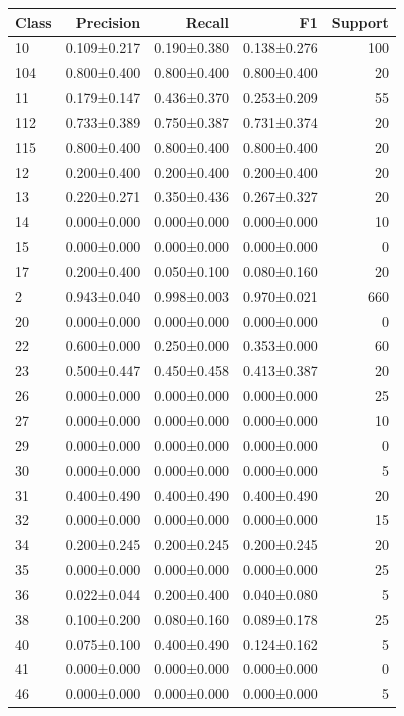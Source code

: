 \begin{tabular}{lrrrr}
\toprule
Class & Precision & Recall & F1 & Support \\
\midrule
10 & 0.109±0.217 & 0.190±0.380 & 0.138±0.276 & 100 \\
104 & 0.800±0.400 & 0.800±0.400 & 0.800±0.400 & 20 \\
11 & 0.179±0.147 & 0.436±0.370 & 0.253±0.209 & 55 \\
112 & 0.733±0.389 & 0.750±0.387 & 0.731±0.374 & 20 \\
115 & 0.800±0.400 & 0.800±0.400 & 0.800±0.400 & 20 \\
12 & 0.200±0.400 & 0.200±0.400 & 0.200±0.400 & 20 \\
13 & 0.220±0.271 & 0.350±0.436 & 0.267±0.327 & 20 \\
14 & 0.000±0.000 & 0.000±0.000 & 0.000±0.000 & 10 \\
15 & 0.000±0.000 & 0.000±0.000 & 0.000±0.000 & 0 \\
17 & 0.200±0.400 & 0.050±0.100 & 0.080±0.160 & 20 \\
2 & 0.943±0.040 & 0.998±0.003 & 0.970±0.021 & 660 \\
20 & 0.000±0.000 & 0.000±0.000 & 0.000±0.000 & 0 \\
22 & 0.600±0.000 & 0.250±0.000 & 0.353±0.000 & 60 \\
23 & 0.500±0.447 & 0.450±0.458 & 0.413±0.387 & 20 \\
26 & 0.000±0.000 & 0.000±0.000 & 0.000±0.000 & 25 \\
27 & 0.000±0.000 & 0.000±0.000 & 0.000±0.000 & 10 \\
29 & 0.000±0.000 & 0.000±0.000 & 0.000±0.000 & 0 \\
30 & 0.000±0.000 & 0.000±0.000 & 0.000±0.000 & 5 \\
31 & 0.400±0.490 & 0.400±0.490 & 0.400±0.490 & 20 \\
32 & 0.000±0.000 & 0.000±0.000 & 0.000±0.000 & 15 \\
34 & 0.200±0.245 & 0.200±0.245 & 0.200±0.245 & 20 \\
35 & 0.000±0.000 & 0.000±0.000 & 0.000±0.000 & 25 \\
36 & 0.022±0.044 & 0.200±0.400 & 0.040±0.080 & 5 \\
38 & 0.100±0.200 & 0.080±0.160 & 0.089±0.178 & 25 \\
40 & 0.075±0.100 & 0.400±0.490 & 0.124±0.162 & 5 \\
41 & 0.000±0.000 & 0.000±0.000 & 0.000±0.000 & 0 \\
46 & 0.000±0.000 & 0.000±0.000 & 0.000±0.000 & 5 \\

\end{tabular}
